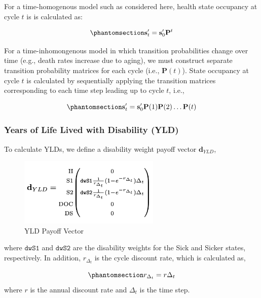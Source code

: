 \documentclass[
]{agujournal2019}
\begin{document}
For a time-homogenous model such as considered here, health state
occupancy at cycle \(t\) is is calculated as:

\begin{equation}\phantomsection\label{eq-trace}{
\mathbf{s}'_t=\mathbf{s}'_0 \mathbf{P}^t
}\end{equation}

For a time-inhomongenous model in which transition probabilities change
over time (e.g., death rates increase due to aging), we must construct
separate transition probability matrices for each cycle (i.e.,
\(\mathbf{P}(t)\)). State occupancy at cycle \(t\) is calculated by
sequentially applying the transition matrices corresponding to each time
step leading up to cycle \(t\), i.e.,

\begin{equation}\phantomsection\label{eq-trace-inhomo}{
\mathbf{s}'_t=\mathbf{s}'_0 \mathbf{P}(1)\mathbf{P}(2)\dots\mathbf{P}(t)
}\end{equation}

\subsubsection{Years of Life Lived with Disability
(YLD)}\label{years-of-life-lived-with-disability-yld}

To calculate YLDs, we define a disability weight payoff vector
\(\mathbf{d}_{YLD}\),

\begin{figure}[H]

{\centering \includegraphics[width=0.6\textwidth,height=\textheight]{images/d_yld.png}

}

\caption{YLD Payoff Vector}

\end{figure}%

where \(\texttt{dwS1}\) and \(\texttt{dwS2}\) are the disability weights
for the Sick and Sicker states, respectively. In addition,
\(r_{\Delta_t}\) is the cycle discount rate, which is calculated as,

\begin{equation}\phantomsection\label{eq-cycledisc}{
r_{\Delta_t} = r \Delta_t
}\end{equation} where \(r\) is the annual discount rate and \(\Delta_t\)
is the time step.
\end{document}
